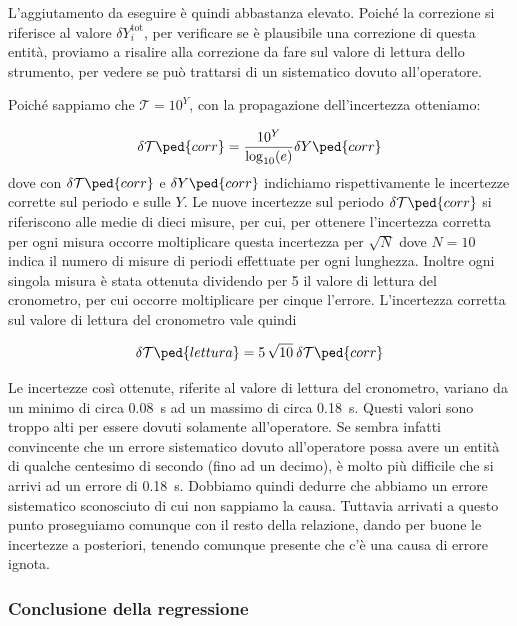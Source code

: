 L'aggiutamento da eseguire è quindi abbastanza elevato. Poiché la correzione si riferisce al valore $\delta Y_i^{\text{tot}}$,
per verificare se è plausibile una correzione di questa entità, proviamo a risalire alla correzione da fare sul valore di lettura
dello strumento, per vedere se può trattarsi di un sistematico dovuto all'operatore.

Poiché sappiamo che $\mathcal{T} = 10^Y$, con la propagazione dell'incertezza otteniamo:

\begin{equation}
    \delta \mathcal{T}\ped{corr} = \frac{10^Y}{\log_{10}(e)} \delta Y\ped{corr}
\end{equation}
%
dove con $\delta \mathcal{T}\ped{corr}$ e $\delta Y\ped{corr}$ indichiamo rispettivamente le incertezze corrette sul periodo e sulle $Y$.
Le nuove incertezze sul periodo $\delta \mathcal{T}\ped{corr}$ si riferiscono alle medie di dieci misure, per cui,
per ottenere l'incertezza corretta per ogni misura occorre moltiplicare questa incertezza per $\sqrt{N}$ dove $N = 10$
indica il numero di misure di periodi effettuate per ogni lunghezza. Inoltre ogni singola misura è stata ottenuta dividendo per 5 il valore
di lettura del cronometro, per cui occorre moltiplicare per cinque l'errore. L'incertezza corretta sul valore di lettura del cronometro
vale quindi

\begin{equation}
    \delta \mathcal{T}\ped{lettura} = 5\, \sqrt{10}\: \delta \mathcal{T}\ped{corr}
\end{equation}

Le incertezze così ottenute, riferite al valore di lettura del cronometro, variano da un minimo di circa \SI{0.08}{\second} ad un massimo
di circa \SI{0.18}{\second}. Questi valori sono troppo alti per essere dovuti solamente all'operatore. Se sembra infatti convincente
che un errore sistematico dovuto all'operatore possa avere un entità di qualche centesimo di secondo (fino ad un decimo), è
molto più difficile che si arrivi ad un errore di \SI{0.18}{\second}. Dobbiamo quindi dedurre che abbiamo un errore sistematico
sconosciuto di cui non sappiamo la causa. Tuttavia arrivati a questo punto proseguiamo comunque con il resto della relazione, dando
per buone le incertezze a posteriori, tenendo comunque presente che c'è una causa di errore ignota.

\subsubsection{Conclusione della regressione}

